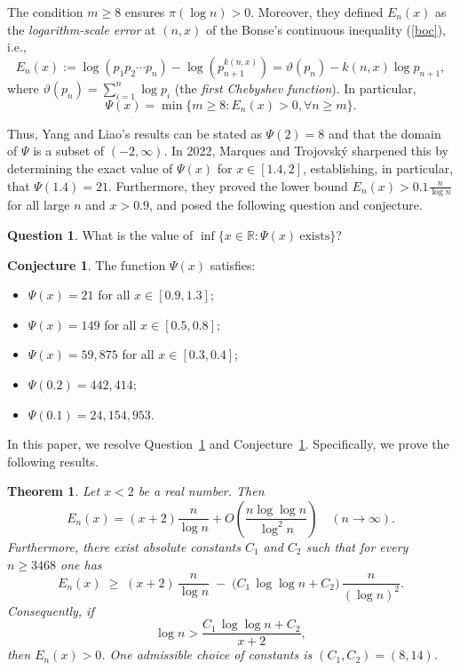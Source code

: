 \documentclass[10pt]{amsart}
\newtheorem{theorem}{Theorem}[section]
\theoremstyle{definition} %
\newtheorem{conjecture}{Conjecture}
\newtheorem{question}{Question}
\numberwithin{equation}{section}
\def\R {\mathbb{R}}
\def\dfrac {\displaystyle\frac}
\def\dfrac {\displaystyle\frac}
\begin{document}
The condition $m \geq 8$ ensures $\pi(\log n) > 0$. Moreover, they defined $E_n(x)$ as the \textit{logarithm-scale error} at $(n,x)$ of the Bonse's continuous inequality (\ref{boc}), i.e.,
\[
E_n(x):=\log(p_1p_2\cdots p_n)-\log(p_{n+1}^{k(n,x)})=\vartheta(p_n)-k(n,x)\log p_{n+1},
\]
where $\vartheta(p_n)=\sum_{i=1}^n\log p_i$ (the \emph{first Chebyshev function}). In particular, 
\[
\Psi(x)=\min\{m\geq 8 : E_n(x)>0, \forall n\geq m\}.
\]

Thus, Yang and Liao's results can be stated as $\Psi(2)=8$ and that the domain of $\Psi$ is a subset of $(-2,\infty)$. In 2022, Marques and Trojovsk\' y \cite{mt1} sharpened this by determining the exact value of $\Psi(x)$ for $x\in [1.4, 2]$, establishing, in particular, that $\Psi(1.4)=21$. Furthermore, they proved the lower bound $E_n(x) > 0.1 \frac{n}{\log n}$ for all large $n$ and $x>0.9$, and posed the following question and conjecture.

\begin{question}\label{que1}
What is the value of $\inf\{x\in \R : \Psi(x)\ \mbox{exists}\}$?
\end{question}

\begin{conjecture}\label{cj1}
The function $\Psi(x)$ satisfies:
\begin{itemize}
\item[(i)] $\Psi(x)=21$ for all $x\in [0.9, 1.3]$;
\item[(ii)] $\Psi(x)=149$ for all $x\in [0.5, 0.8]$;
\item[(iii)] $\Psi(x)=59,875$ for all $x\in [0.3, 0.4]$;
\item[(iv)] $\Psi(0.2)=442,414$;
\item[(v)] $\Psi(0.1)=24,154,953$.
\end{itemize}
\end{conjecture}

In this paper, we resolve Question~\ref{que1} and Conjecture~\ref{cj1}. Specifically, we prove the following results.

\begin{theorem}\label{main1}
Let $x<2$ be a real number. Then
\begin{equation}\label{maineq1}
    E_n(x)=(x+2)\dfrac{n}{\log n}+ O\left(\dfrac{n\log \log n}{\log^2 n}\right) \quad (n\to \infty).
\end{equation}
Furthermore, there exist absolute constants $C_1$ and $C_2$ such that for every $n\ge 3468$ one has
\[
E_n(x)\;\ge\; (x+2)\,\frac{n}{\log n}\;-\;\Big(C_1\,\log\log n+C_2\Big)\,\frac{n}{(\log n)^2}.
\]
Consequently, if
\begin{equation}\label{lowerE}
\log n>\frac{C_1\,\log \log n+C_2}{x+2},
\end{equation}
then $E_n(x)>0$. One admissible choice of constants is $(C_1,C_2)=(8,14)$.
\end{theorem}
\end{document}
